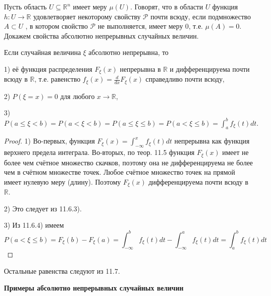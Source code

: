 \begin{definition}
Пусть область $U \subseteq \mathbb{R}^n$ имеет меру $\mu(U )$. Говорят, что в области $U$ функция $h : U \to \mathbb{R}$ удовлетворяет некоторому свойству $\mathcal{P}$ почти всюду, если подмножество $A \subset U$ , в котором свойство $\mathcal{P}$ не выполняется, имеет меру 0, т.е. $\mu(A) = 0$.
Докажем свойства абсолютно непрерывных случайных величин.
\end{definition}

\begin{theorem}
Если случайная величина $\xi$ абсолютно непрерывна, то

1) её функция распределения $F_{\xi}(x)$ непрерывна в $\mathbb{R}$ и дифференцируема почти всюду в $\mathbb{R}$, т.е. равенство $f_{\xi}(x) = \frac{d}{dx}F_{\xi}(x)$ справедливо почти всюду,

2) $P(\xi = x) = 0$ для любого $x \to \mathbb{R}$,

3) $P(a \leq \xi < b) = P(a < \xi < b) = P(a \leq \xi \leq b) = P(a < \xi \leq b) = \int_{a}^{b}f_{\xi}(t)dt.$
\end{theorem}

\begin{proof}
1) Во-первых, функция $F_{\xi}(x) = \int_{-\infty}^{x}f_{\xi}(t)dt$ непрерывна как функция верхнего предела интеграла.
Во-вторых, по теор. 11.5 функция $F_{\xi}(x)$ имеет не более чем счётное множество скачков, поэтому она не дифференцируема не более чем в счётном
множестве точек. Любое счётное множество точек на прямой имеет нулевую меру (длину). Поэтому $F_{\xi}(x)$ дифференцируема почти всюду в $\mathbb{R}$.

2) Это следует из 11.6.3).

3) Из 11.6.4) имеем
$$P(a < \xi \leq b) = F_{\xi}(b) - F_{\xi}(a) = \int_{-\infty}^{b}f_{\xi}(t)dt - \int_{-\infty}^{a}f_{\xi}(t)dt = \int_{a}^{b}f_{\xi}(t)dt$$

\end{proof}
Остальные равенства следуют из 11.7.

\vspace{1em}\textbf{Примеры абсолютно непрерывных случайных величин}

